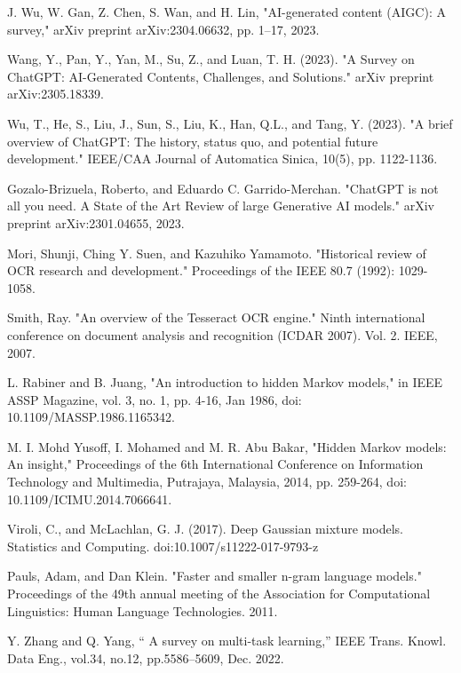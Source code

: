 \documentclass[conference]{IEEEtran}
\begin{document}


\begin{thebibliography}{00}
 J. Wu, W. Gan, Z. Chen, S. Wan, and H. Lin, "AI-generated content (AIGC): A survey," arXiv preprint arXiv:2304.06632, pp. 1–17, 2023.

 Wang, Y., Pan, Y., Yan, M., Su, Z., and Luan, T. H. (2023). "A Survey on ChatGPT: AI-Generated Contents, Challenges, and Solutions." arXiv preprint arXiv:2305.18339.

 Wu, T., He, S., Liu, J., Sun, S., Liu, K., Han, Q.L., and Tang, Y. (2023). "A brief overview of ChatGPT: The history, status quo, and potential future development." IEEE/CAA Journal of Automatica Sinica, 10(5), pp. 1122-1136.

 Gozalo-Brizuela, Roberto, and Eduardo C. Garrido-Merchan. "ChatGPT is not all you need. A State of the Art Review of large Generative AI models." arXiv preprint arXiv:2301.04655, 2023.

 Mori, Shunji, Ching Y. Suen, and Kazuhiko Yamamoto. "Historical review of OCR research and development." Proceedings of the IEEE 80.7 (1992): 1029-1058.

 Smith, Ray. "An overview of the Tesseract OCR engine." Ninth international conference on document analysis and recognition (ICDAR 2007). Vol. 2. IEEE, 2007.

 L. Rabiner and B. Juang, "An introduction to hidden Markov models," in IEEE ASSP Magazine, vol. 3, no. 1, pp. 4-16, Jan 1986, doi: 10.1109/MASSP.1986.1165342.

 M. I. Mohd Yusoff, I. Mohamed and M. R. Abu Bakar, "Hidden Markov models: An insight," Proceedings of the 6th International Conference on Information Technology and Multimedia, Putrajaya, Malaysia, 2014, pp. 259-264, doi: 10.1109/ICIMU.2014.7066641.

 Viroli, C., and  McLachlan, G. J. (2017). Deep Gaussian mixture models. Statistics and Computing. doi:10.1007/s11222-017-9793-z

Pauls, Adam, and Dan Klein. "Faster and smaller n-gram language models." Proceedings of the 49th annual meeting of the Association for Computational Linguistics: Human Language Technologies. 2011.

  Y. Zhang and Q. Yang, “ A survey on multi-task learning,” IEEE Trans. Knowl. Data Eng., vol.34, no.12, pp.5586–5609, Dec. 2022.


\end{thebibliography}
\end{document}
